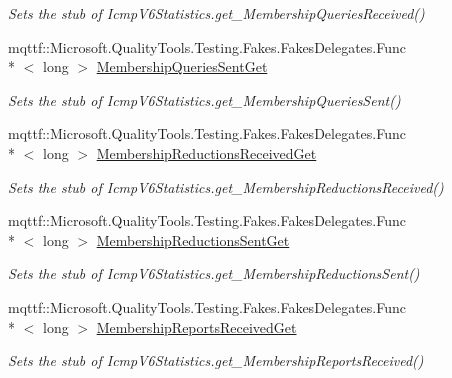 \begin{DoxyCompactItemize}
\begin{DoxyCompactList}\small\item\em Sets the stub of Icmp\-V6\-Statistics.\-get\-\_\-\-Membership\-Queries\-Received()\end{DoxyCompactList}\item 
mqttf\-::\-Microsoft.\-Quality\-Tools.\-Testing.\-Fakes.\-Fakes\-Delegates.\-Func\\*
$<$ long $>$ \hyperlink{class_system_1_1_net_1_1_network_information_1_1_fakes_1_1_stub_icmp_v6_statistics_a671a23d870d05cb9d18058cdb9bd13b1}{Membership\-Queries\-Sent\-Get}
\begin{DoxyCompactList}\small\item\em Sets the stub of Icmp\-V6\-Statistics.\-get\-\_\-\-Membership\-Queries\-Sent()\end{DoxyCompactList}\item 
mqttf\-::\-Microsoft.\-Quality\-Tools.\-Testing.\-Fakes.\-Fakes\-Delegates.\-Func\\*
$<$ long $>$ \hyperlink{class_system_1_1_net_1_1_network_information_1_1_fakes_1_1_stub_icmp_v6_statistics_a5d91c1133310b48883c375ad0e1d288b}{Membership\-Reductions\-Received\-Get}
\begin{DoxyCompactList}\small\item\em Sets the stub of Icmp\-V6\-Statistics.\-get\-\_\-\-Membership\-Reductions\-Received()\end{DoxyCompactList}\item 
mqttf\-::\-Microsoft.\-Quality\-Tools.\-Testing.\-Fakes.\-Fakes\-Delegates.\-Func\\*
$<$ long $>$ \hyperlink{class_system_1_1_net_1_1_network_information_1_1_fakes_1_1_stub_icmp_v6_statistics_a22dec6dad4ddf7aff50461618c77a719}{Membership\-Reductions\-Sent\-Get}
\begin{DoxyCompactList}\small\item\em Sets the stub of Icmp\-V6\-Statistics.\-get\-\_\-\-Membership\-Reductions\-Sent()\end{DoxyCompactList}\item 
mqttf\-::\-Microsoft.\-Quality\-Tools.\-Testing.\-Fakes.\-Fakes\-Delegates.\-Func\\*
$<$ long $>$ \hyperlink{class_system_1_1_net_1_1_network_information_1_1_fakes_1_1_stub_icmp_v6_statistics_ab905235d41566bceb6d3ca9a22dc4536}{Membership\-Reports\-Received\-Get}
\begin{DoxyCompactList}\small\item\em Sets the stub of Icmp\-V6\-Statistics.\-get\-\_\-\-Membership\-Reports\-Received()\end{DoxyCompactList}\item 

\end{DoxyCompactItemize}

